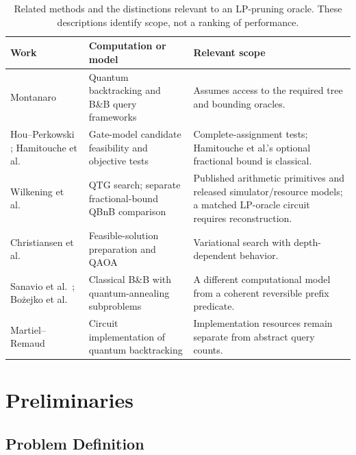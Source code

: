 \documentclass[conference]{IEEEtran}
\begin{document}
\begin{table}[t]
\caption{Related methods and the distinctions relevant to an LP-pruning oracle. These descriptions identify scope, not a ranking of performance.}
\label{tab:related}
\begin{center}
\footnotesize
\setlength{\tabcolsep}{5pt}
\begin{tabular}{p{}p{}p{}}
\toprule
\textbf{Work} & \textbf{Computation or model} & \textbf{Relevant scope} \\
\midrule
Montanaro \cite{ref35,ref24} & Quantum backtracking and B\&B query frameworks & Assumes access to the required tree and bounding oracles. \\
Hou--Perkowski \cite{hou2020}; Hamitouche et al.\ \cite{hamitouche2025} & Gate-model candidate feasibility and objective tests & Complete-assignment tests; Hamitouche et al.'s optional fractional bound is classical. \\
Wilkening et al.\ \cite{wilkening2025,wilkening2025code} & QTG search; separate fractional-bound QBnB comparison & Published arithmetic primitives and released simulator/resource models; a matched LP-oracle circuit requires reconstruction. \\
Christiansen et al.\ \cite{ref23} & Feasible-solution preparation and QAOA & Variational search with depth-dependent behavior. \\
Sanavio et al.\ \cite{ref36}; Bo\.{z}ejko et al.\ \cite{bozejko2026} & Classical B\&B with quantum-annealing subproblems & A different computational model from a coherent reversible prefix predicate. \\
Martiel--Remaud \cite{martiel2019} & Circuit implementation of quantum backtracking & Implementation resources remain separate from abstract query counts. \\
\bottomrule
\end{tabular}
\end{center}
\end{table}

\section{Preliminaries}

\subsection{Problem Definition}
\end{document}
